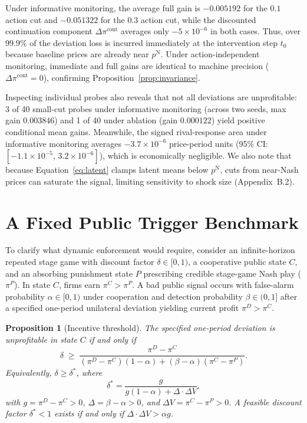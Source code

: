 \documentclass{article}
\newtheorem{proposition}{Proposition}
\begin{document}
Under informative monitoring, the average full gain is $-0.005192$ for the $0.1$ action cut and $-0.051322$ for the $0.3$ action cut, while the discounted continuation component $\Delta\pi^{\mathrm{cont}}$ averages only $-5\times 10^{-6}$ in both cases. Thus, over $99.9\%$ of the deviation loss is incurred immediately at the intervention step $t_0$ because baseline prices are already near $p^{\mathrm{N}}$. Under action-independent monitoring, immediate and full gains are identical to machine precision ($\Delta\pi^{\mathrm{cont}}=0$), confirming Proposition~\ref{prop:invariance}.

Inspecting individual probes also reveals that not all deviations are unprofitable: 3 of 40 small-cut probes under informative monitoring (across two seeds, max gain $0.003846$) and 1 of 40 under ablation (gain $0.000122$) yield positive conditional mean gains. Meanwhile, the signed rival-response area under informative monitoring averages $-3.7\times 10^{-6}$ price-period units (95\% CI: $[-1.1\times 10^{-5},\,3.2\times 10^{-6}]$), which is economically negligible. We also note that because Equation~\eqref{eq:latent} clamps latent means below $p^{\mathrm{N}}$, cuts from near-Nash prices can saturate the signal, limiting sensitivity to shock size (Appendix~B.2).

\section{A Fixed Public Trigger Benchmark}

To clarify what dynamic enforcement would require, consider an infinite-horizon repeated stage game with discount factor $\delta\in[0,1)$, a cooperative public state $C$, and an absorbing punishment state $P$ prescribing credible stage-game Nash play ($\pi^P$). In state $C$, firms earn $\pi^C > \pi^P$. A bad public signal occurs with false-alarm probability $\alpha\in[0,1)$ under cooperation and detection probability $\beta\in(0,1]$ after a specified one-period unilateral deviation yielding current profit $\pi^D > \pi^C$.

\begin{proposition}[Incentive threshold]\label{prop:threshold}
The specified one-period deviation is unprofitable in state $C$ if and only if
\begin{equation}\label{eq:threshold}
\delta \;\geq\;
\frac{\pi^D - \pi^C}
{(\pi^D-\pi^C)(1-\alpha) + (\beta-\alpha)(\pi^C-\pi^P)}.
\end{equation}
Equivalently, $\delta\geq\delta^*$, where
\[
\delta^* = \frac{g}{g(1-\alpha) + \Delta\cdot\Delta V},
\]
with $g=\pi^D-\pi^C>0$, $\Delta=\beta-\alpha>0$, and $\Delta V=\pi^C-\pi^P>0$. A feasible discount factor $\delta^*<1$ exists if and only if $\Delta\cdot\Delta V > \alpha g$.
\end{proposition}
\end{document}
